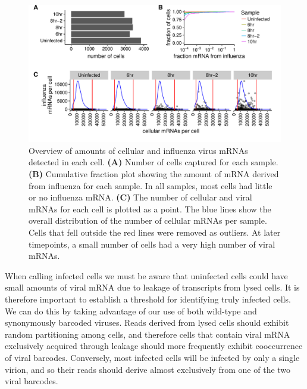 \documentclass[9pt,lineno]{elife}
\begin{document}
\begin{figure}
\includegraphics[width=\linewidth]{figures/p_cell_mRNA_summary.pdf}
\caption{\label{fig:cells}
Overview of amounts of cellular and influenza virus mRNAs detected in each cell.
{\bf (A)} 
Number of cells captured for each sample.
{\bf (B)} 
Cumulative fraction plot showing the amount of mRNA derived from influenza for each sample.
In all samples, most cells had little or no influenza mRNA.
{\bf (C)} 
The number of cellular and viral mRNAs for each cell is plotted as a point.
The blue lines show the overall distribution of the number of cellular mRNAs per sample.
Cells that fell outside the red lines were removed as outliers.
At later timepoints, a small number of cells had a very high number of viral mRNAs.
}
\end{figure}

When calling infected cells we must be aware that uninfected cells could have small amounts of viral mRNA due to leakage of transcripts from lysed cells.
It is therefore important to establish a threshold for identifying truly infected cells.
We can do this by taking advantage of our use of both wild-type and synonymously barcoded viruses.
Reads derived from lysed cells should exhibit random partitioning among cells, and therefore cells that contain viral mRNA exclusively acquired  through leakage should more frequently exhibit cooccurrence of viral barcodes.
Conversely, most infected cells will be infected by only a single virion, and so their reads should derive almost exclusively from one of the two viral barcodes. 
\end{document}
